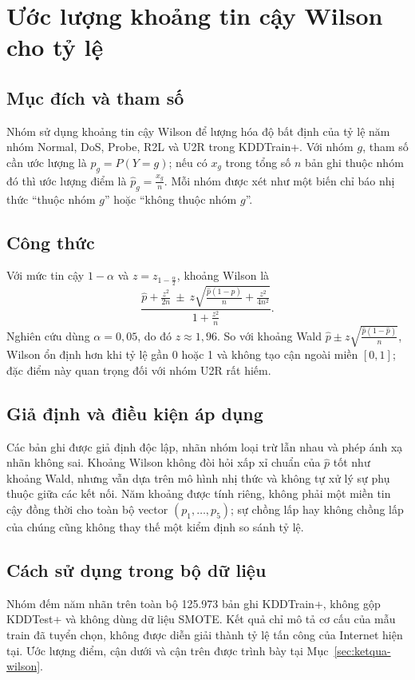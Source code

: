 \section{Ước lượng khoảng tin cậy Wilson cho tỷ lệ}
\label{sec:phuongphap-wilson}

\subsection{Mục đích và tham số}
Nhóm sử dụng khoảng tin cậy Wilson để lượng hóa độ bất định của tỷ lệ năm nhóm
Normal, DoS, Probe, R2L và U2R trong KDDTrain+. Với nhóm $g$, tham số cần ước lượng là
$p_g=P(Y=g)$; nếu có $x_g$ trong tổng số $n$ bản ghi thuộc nhóm đó thì ước lượng điểm là
$\widehat p_g=\frac{x_g}{n}$. Mỗi nhóm được xét như một biến chỉ báo nhị thức ``thuộc
nhóm $g$'' hoặc ``không thuộc nhóm $g$''.

\subsection{Công thức}
Với mức tin cậy $1-\alpha$ và $z=z_{1-\frac{\alpha}{2}}$, khoảng Wilson là
\[
\frac{
  \widehat p+\frac{z^2}{2n}
  \ \pm\ z\sqrt{\frac{\widehat p(1-\widehat p)}{n}+\frac{z^2}{4n^2}}
}{1+\frac{z^2}{n}}.
\]
Nghiên cứu dùng $\alpha=0{,}05$, do đó $z\approx1{,}96$. So với khoảng Wald
$\widehat p\pm z\sqrt{\frac{\widehat p(1-\widehat p)}{n}}$, Wilson ổn định hơn khi
tỷ lệ gần 0 hoặc 1 và không tạo cận ngoài miền $[0,1]$; đặc điểm này quan trọng đối
với nhóm U2R rất hiếm.

\subsection{Giả định và điều kiện áp dụng}
Các bản ghi được giả định độc lập, nhãn nhóm loại trừ lẫn nhau và phép ánh xạ nhãn
không sai. Khoảng Wilson không đòi hỏi xấp xỉ chuẩn của $\widehat p$ tốt như khoảng
Wald, nhưng vẫn dựa trên mô hình nhị thức và không tự xử lý sự phụ thuộc giữa các kết
nối. Năm khoảng được tính riêng, không phải một miền tin cậy đồng thời cho toàn bộ
vector $(p_1,\ldots,p_5)$; sự chồng lấp hay không chồng lấp của chúng cũng không thay
thế một kiểm định so sánh tỷ lệ.

\subsection{Cách sử dụng trong bộ dữ liệu}
Nhóm đếm năm nhãn trên toàn bộ 125.973 bản ghi KDDTrain+, không gộp KDDTest+ và không
dùng dữ liệu SMOTE. Kết quả chỉ mô tả cơ cấu của mẫu train đã tuyển chọn, không được
diễn giải thành tỷ lệ tấn công của Internet hiện tại. Ước lượng điểm, cận dưới và cận
trên được trình bày tại Mục~\ref{sec:ketqua-wilson}.

